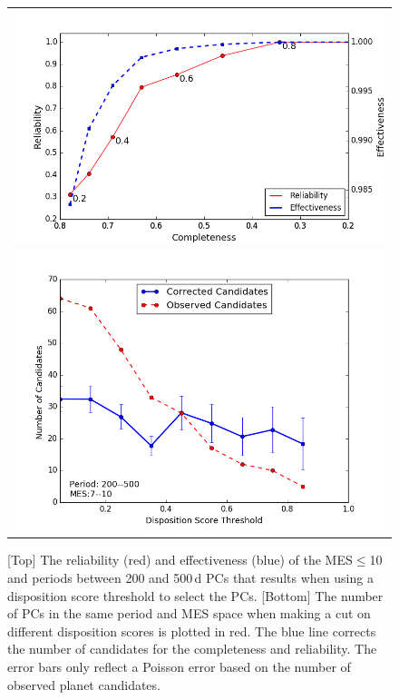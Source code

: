 \begin{figure}[ht]
 \begin{center}
 \begin{tabular}{c}
  \includegraphics[width=1.0\linewidth]{fig-CRadjustScore-DR25.png} \\
  \includegraphics[width=1.0\linewidth]{fig-varyScoreNcandidatesBox2.png}
  \end{tabular}
  \caption{\label{f:adjscore}[Top] The reliability (red) and effectiveness (blue) of the MES$\leq$10 and periods between 200 and 500\,d PCs that results when using a disposition score threshold to select the PCs.  [Bottom] The number of PCs in the same period and MES space when making a cut on different disposition scores is plotted in red.  The blue line corrects the number of candidates for the completeness and reliability. The error bars only reflect a Poisson error based on the number of observed planet candidates.}
 \end{center}
 \end{figure}


